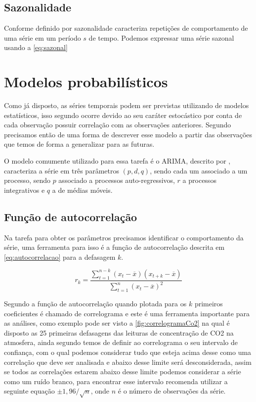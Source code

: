 \documentclass[
	12pt,
	oneside,
	a4paper,
	english,
	brazil
]{abntex2}
\begin{document}
\subsection{Sazonalidade}

Conforme definido por  sazonalidade caracteriza repetições de 
comportamento de uma série em um período $s$ de tempo. Podemos expressar uma 
série sazonal usando a \autoref{eq:sazonal}


\section{Modelos probabilísticos}

Como já disposto, as séries temporais podem ser previstas utilizando de modelos 
estatísticos, isso segundo  ocorre devido ao seu caráter 
estocástico por conta de cada observação possuir correlação com as observações 
anteriores. Segundo  precisamos então de uma forma de descrever 
esse modelo a partir das observações que temos de forma a generalizar para as 
futuras.

O modelo comumente utilizado para essa tarefa é o ARIMA, descrito por 
, caracteriza a série em três parâmetros $(p,d,q)$, sendo cada 
um associado a um processo, sendo $p$ associado a processos auto-regressivos, 
$r$ a processos integrativos e $q$ a de médias móveis.

\subsection{Função de autocorrelação}

Na tarefa para obter os parâmetros precisamos identificar o comportamento da 
série, uma ferramenta para isso é a função de autocorrelação descrita em 
\autoref{eq:autocorrelacao} para a defasagem $k$.

\begin{equation}
    \label{eq:autocorrelacao}
    r_k = \frac{\sum_{t=1}^{n-k}{(x_t - \overline{x})(x_{t+k} - 
    \overline{x})}}{\sum_{t=1}^{n}{(x_t - \overline{x})^2}}
\end{equation}

Segundo  a função de autocorrelação quando plotada para os 
$k$ primeiros coeficientes é chamado de correlograma e este é uma ferramenta 
importante para as análises, como exemplo pode ser visto a 
\autoref{fig:correlogramaCo2} na qual é disposto as 25 primeiras defasagens das 
leituras de concentração de CO2 na atmosfera, ainda segundo  
temos de definir ao correlograma o seu intervalo de confiança, com o qual 
podemos considerar tudo que esteja acima desse como uma correlação que deve ser 
analisada e abaixo desse limite será desconsiderada, assim se todos as 
correlações estarem abaixo desse limite podemos considerar a série como um ruído 
branco, para encontrar esse intervalo  recomenda utilizar a 
seguinte equação $\pm{}1,96/\sqrt{n}$, onde $n$ é o número de observações da 
série.
\end{document}
